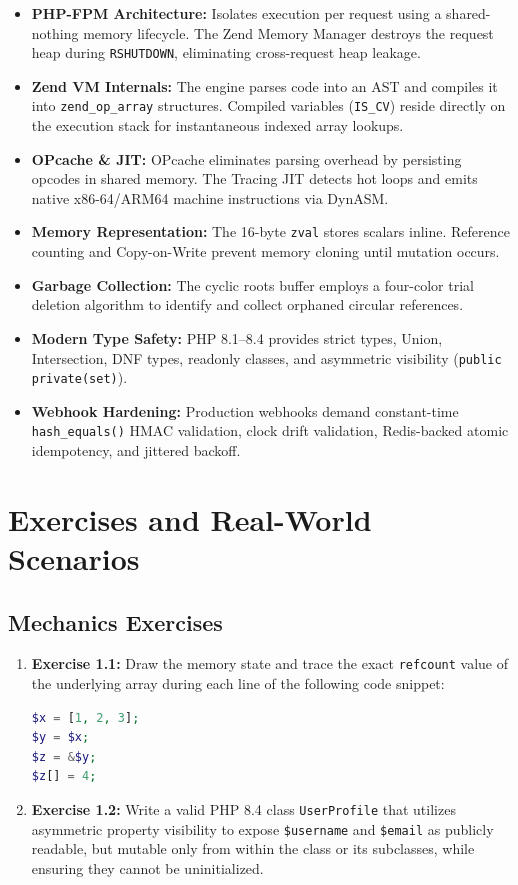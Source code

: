 \begin{itemize}[leftmargin=15pt]
  \item \textbf{PHP-FPM Architecture:} Isolates execution per request using a shared-nothing memory lifecycle. The Zend Memory Manager destroys the request heap during \texttt{RSHUTDOWN}, eliminating cross-request heap leakage.
  \item \textbf{Zend VM Internals:} The engine parses code into an AST and compiles it into \texttt{zend\_op\_array} structures. Compiled variables (\texttt{IS\_CV}) reside directly on the execution stack for instantaneous indexed array lookups.
  \item \textbf{OPcache \& JIT:} OPcache eliminates parsing overhead by persisting opcodes in shared memory. The Tracing JIT detects hot loops and emits native x86-64/ARM64 machine instructions via DynASM.
  \item \textbf{Memory Representation:} The 16-byte \texttt{zval} stores scalars inline. Reference counting and Copy-on-Write prevent memory cloning until mutation occurs.
  \item \textbf{Garbage Collection:} The cyclic roots buffer employs a four-color trial deletion algorithm to identify and collect orphaned circular references.
  \item \textbf{Modern Type Safety:} PHP 8.1--8.4 provides strict types, Union, Intersection, DNF types, readonly classes, and asymmetric visibility (\texttt{public private(set)}).
  \item \textbf{Webhook Hardening:} Production webhooks demand constant-time \texttt{hash\_equals()} HMAC validation, clock drift validation, Redis-backed atomic idempotency, and jittered backoff.
\end{itemize}

\section{Exercises and Real-World Scenarios}

\subsection{Mechanics Exercises}
\begin{enumerate}
  \item \textbf{Exercise 1.1:} Draw the memory state and trace the exact \texttt{refcount} value of the underlying array during each line of the following code snippet:
\begin{lstlisting}[language=PHP]
$x = [1, 2, 3];
$y = $x;
$z = &$y;
$z[] = 4;
\end{lstlisting}
  \item \textbf{Exercise 1.2:} Write a valid PHP 8.4 class \texttt{UserProfile} that utilizes asymmetric property visibility to expose \texttt{\$username} and \texttt{\$email} as publicly readable, but mutable only from within the class or its subclasses, while ensuring they cannot be uninitialized.
\end{enumerate}

